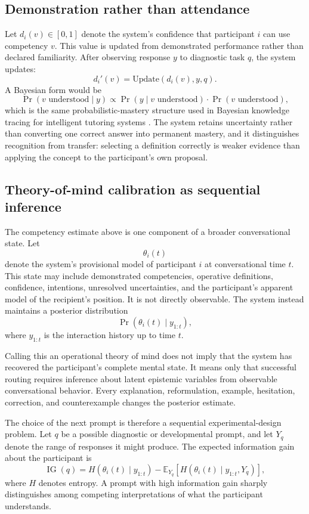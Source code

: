 \documentclass[11pt]{article}
\begin{document}
\subsection{Demonstration rather than attendance}

Let $d_i(v) \in [0,1]$ denote the system's confidence that participant $i$ can use competency $v$. This value is updated from demonstrated performance rather than declared familiarity. After observing response $y$ to diagnostic task $q$, the system updates:
\[
d_i'(v) = \mathrm{Update}(d_i(v), y, q).
\]
A Bayesian form would be
\[
\Pr(v \text{ understood} \mid y) \propto \Pr(y \mid v \text{ understood}) \cdot \Pr(v \text{ understood}),
\]
which is the same probabilistic-mastery structure used in Bayesian knowledge tracing for intelligent tutoring systems \cite{corbett1994}. The system retains uncertainty rather than converting one correct answer into permanent mastery, and it distinguishes recognition from transfer: selecting a definition correctly is weaker evidence than applying the concept to the participant's own proposal.

\subsection{Theory-of-mind calibration as sequential inference}

The competency estimate above is one component of a broader conversational state. Let
\[
\theta_i(t)
\]
denote the system's provisional model of participant $i$ at conversational time $t$. This state may include demonstrated competencies, operative definitions, confidence, intentions, unresolved uncertainties, and the participant's apparent model of the recipient's position. It is not directly observable. The system instead maintains a posterior distribution
\[
\Pr\!\left(\theta_i(t) \mid y_{1:t}\right),
\]
where $y_{1:t}$ is the interaction history up to time $t$.

Calling this an operational theory of mind does not imply that the system has recovered the participant's complete mental state. It means only that successful routing requires inference about latent epistemic variables from observable conversational behavior. Every explanation, reformulation, example, hesitation, correction, and counterexample changes the posterior estimate.

The choice of the next prompt is therefore a sequential experimental-design problem. Let $q$ be a possible diagnostic or developmental prompt, and let $Y_q$ denote the range of responses it might produce. The expected information gain about the participant is
\[
\operatorname{IG}(q)
=
H\!\left(\theta_i(t)\mid y_{1:t}\right)
-
\mathbb{E}_{Y_q}
\left[
H\!\left(\theta_i(t)\mid y_{1:t},Y_q\right)
\right],
\]
where $H$ denotes entropy. A prompt with high information gain sharply distinguishes among competing interpretations of what the participant understands.
\end{document}
